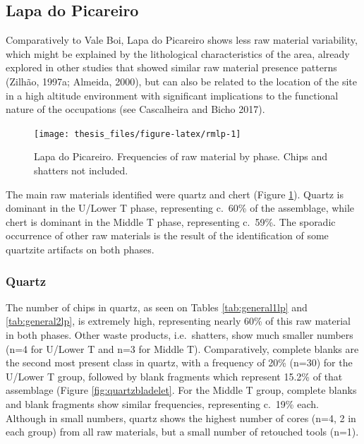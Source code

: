 \documentclass[12pt,twoside]{reedthesis}
\begin{document}
\hypertarget{lapa-do-picareiro-3}{%
\subsection{Lapa do Picareiro}\label{lapa-do-picareiro-3}}

Comparatively to Vale Boi, Lapa do Picareiro shows less raw material variability, which might be explained by the lithological characteristics of the area, already explored in other studies that showed similar raw material presence patterns (Zilhão, 1997a; Almeida, 2000), but can also be related to the location of the site in a high altitude environment with significant implications to the functional nature of the occupations (see Cascalheira and Bicho 2017).
\begin{figure}[H]

{\centering \texttt{[image: thesis\_files/figure-latex/rmlp-1]} 

}

\caption{Lapa do Picareiro. Frequencies of raw material by phase. Chips and shatters not included.}\label{fig:rmlp}
\end{figure}
The main raw materials identified were quartz and chert (Figure \ref{fig:rmlp}). Quartz is dominant in the U/Lower T phase, representing c.~60\% of the assemblage, while chert is dominant in the Middle T phase, representing c.~59\%. The sporadic occurrence of other raw materials is the result of the identification of some quartzite artifacts on both phases.

\hypertarget{quartz-1}{%
\subsubsection{Quartz}\label{quartz-1}}

The number of chips in quartz, as seen on Tables \ref{tab:general1lp} and \ref{tab:general2lp}, is extremely high, representing nearly 60\% of this raw material in both phases. Other waste products, i.e.~shatters, show much smaller numbers (n=4 for U/Lower T and n=3 for Middle T). Comparatively, complete blanks are the second most present class in quartz, with a frequency of 20\% (n=30) for the U/Lower T group, followed by blank fragments which represent 15.2\% of that assemblage (Figure \ref{fig:quartzbladelet}. For the Middle T group, complete blanks and blank fragments show similar frequencies, representing c.~19\% each. Although in small numbers, quartz shows the highest number of cores (n=4, 2 in each group) from all raw materials, but a small number of retouched tools (n=1).
\end{document}
